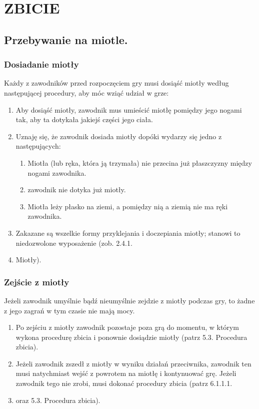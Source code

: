 \documentclass[12pt]{article}
\begin{document}
\pagebreak
\section{ZBICIE}

\subsection{Przebywanie na miotle.}

\subsubsection{Dosiadanie miotły}

Każdy z zawodników przed rozpoczęciem gry musi dosiąść miotły według
następującej procedury, aby móc wziąć udział w grze:

\begin{enumerate}
	\item
	      Aby dosiąść miotły, zawodnik mus umieścić miotłę pomiędzy jego nogami
	      tak, aby ta dotykała jakiejś części jego ciała.
	\item
	      Uznaję się, że zawodnik dosiada miotły dopóki wydarzy się jedno z
	      następujących:

	      \begin{enumerate}
		      \item
		            Miotła (lub ręka, która ją trzymała) nie przecina już płaszczyzny
		            między nogami zawodnika.
		      \item
		            zawodnik nie dotyka już miotły.
		      \item
		            Miotła leży płasko na ziemi, a pomiędzy nią a ziemią nie ma ręki
		            zawodnika.
	      \end{enumerate}
	\item
	      Zakazane są wszelkie formy przyklejania i doczepiania miotły; stanowi
	      to niedozwolone wyposażenie (zob. 2.4.1.\item Miotły).
\end{enumerate}

\subsubsection{Zejście z miotły}

Jeżeli zawodnik umyślnie bądź nieumyślnie zejdzie z miotły podczas gry,
to żadne z jego zagrań w tym czasie nie mają mocy.

\begin{enumerate}
	\item
	      Po zejściu z miotły zawodnik pozostaje poza grą do momentu, w którym
	      wykona procedurę zbicia i ponownie dosiądzie miotły (patrz 5.3.
	      Procedura zbicia).
	\item
	      Jeżeli zawodnik zszedł z miotły w wyniku działań przeciwnika, zawodnik
	      ten musi natychmiast wejść z powrotem na miotłę i kontynuować grę.
	      Jeżeli zawodnik tego nie zrobi, musi dokonać procedury zbicia (patrz
	      6.1.1.1.\item oraz 5.3. Procedura zbicia).
\end{enumerate}
\end{document}
